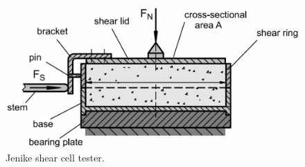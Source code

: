 \begin{figure}[!htb]
\centering
\includegraphics[width=.80\columnwidth]{images/003sjsct}
\caption[Jenike shear cell tester]{Jenike shear cell tester.}
\label{fig:003sjsct}
\end{figure}
